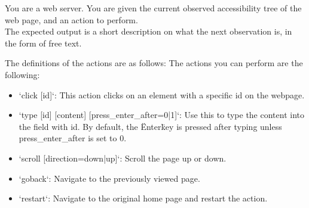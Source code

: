 \documentclass[11pt]{article}
\begin{document}
\begin{tcolorbox}[colback=blue!5!white, colframe=blue!75!black, breakable, title = {\textsc{World Model Look-Ahead (Abstract Description)}}]\label{prompt:wm_inherent}

\ttfamily
\small


You are a web server. You are given the current observed accessibility tree of the web page, and an action to perform. \\

The expected output is a short description on what the next observation is, in the form of free text.

The definitions of the actions are as follows: The actions you can perform are the following:
\begin{itemize}[leftmargin=*]
  \item `click [id]`: This action clicks on an element with a specific id on the webpage.
  \item `type [id] [content] [press\_enter\_after=0|1]`: Use this to type the content into the field with id. By default, the \"Enter\" key is pressed after typing unless press\_enter\_after is set to 0.
  \item `scroll [direction=down|up]`: Scroll the page up or down.
  \item `goback`: Navigate to the previously viewed page.
  \item `restart`: Navigate to the original home page and restart the action.
\end{itemize}
\end{tcolorbox}

\end{document}
